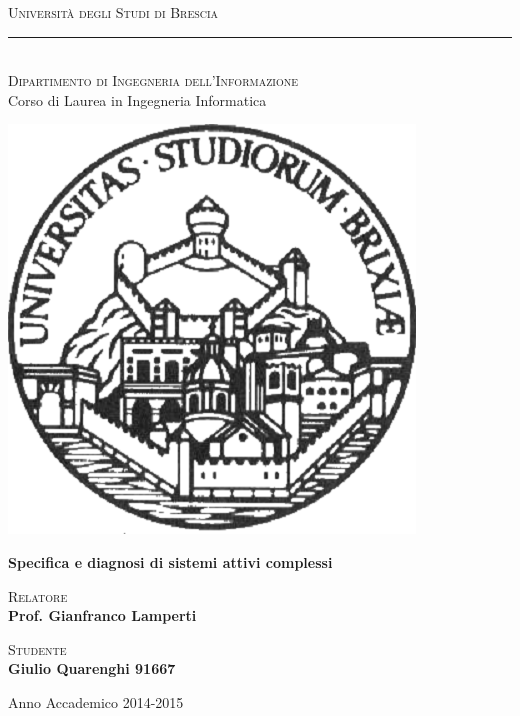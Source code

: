 \documentclass[12pt,a4paper,oneside,openright]{book}
\begin{document}
\begin{titlepage}
\begin{center}
{{\Large{\textsc{Università degli Studi di Brescia}}}\\
\rule{0.5\textwidth}{0.1mm}
\vspace{5mm}
\textsc{\\Dipartimento di Ingegneria dell'Informazione\\}
Corso di Laurea in Ingegneria Informatica}
\end{center}
\vspace{15mm}
\begin{center}
\includegraphics[width=.33\columnwidth]{../Logo/logo.png}
\end{center}
\vspace{10mm}

\begin{center}
{\LARGE{\textbf{Specifica e diagnosi di sistemi attivi complessi}}}
\end{center}
\vspace{5mm}
\par
\noindent
\begin{minipage}[t]{0.47\textwidth}
\vspace{20mm}
{{\textsc{Relatore}\\
\textbf{Prof. Gianfranco Lamperti}
}}
\end{minipage}
\hfill
\begin{minipage}[t]{0.47\textwidth}\raggedleft
{{\vspace{20mm}
\textsc{ Studente}\\
\textbf {Giulio Quarenghi 91667}\\

}}
\end{minipage}
\vspace{25mm}

\begin{center}
{\large{ Anno Accademico 2014-2015}}%
\end{center}
\end{titlepage}
\end{document}
